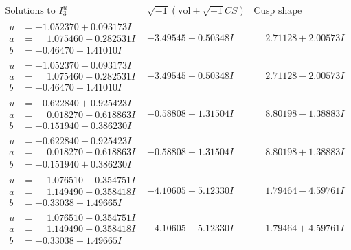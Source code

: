 \documentclass[1p]{elsarticle_modified}
\theoremstyle{definition}
\newcommand{\I}{\sqrt{-1}}
\begin{document}
$$\begin{array}{c|c|c}  
\text{Solutions to }I^u_{3}& \I (\text{vol} + \sqrt{-1}CS) & \text{Cusp shape}\\
 \hline 
\begin{aligned}
u &= -1.052370 + 0.093173 I \\
a &= \phantom{-}1.075460 + 0.282531 I \\
b &= -0.46470 - 1.41010 I\end{aligned}
 & -3.49545 + 0.50348 I & \phantom{-}2.71128 + 2.00573 I \\ \hline\begin{aligned}
u &= -1.052370 - 0.093173 I \\
a &= \phantom{-}1.075460 - 0.282531 I \\
b &= -0.46470 + 1.41010 I\end{aligned}
 & -3.49545 - 0.50348 I & \phantom{-}2.71128 - 2.00573 I \\ \hline\begin{aligned}
u &= -0.622840 + 0.925423 I \\
a &= \phantom{-}0.018270 - 0.618863 I \\
b &= -0.151940 - 0.386230 I\end{aligned}
 & -0.58808 + 1.31504 I & \phantom{-}8.80198 - 1.38883 I \\ \hline\begin{aligned}
u &= -0.622840 - 0.925423 I \\
a &= \phantom{-}0.018270 + 0.618863 I \\
b &= -0.151940 + 0.386230 I\end{aligned}
 & -0.58808 - 1.31504 I & \phantom{-}8.80198 + 1.38883 I \\ \hline\begin{aligned}
u &= \phantom{-}1.076510 + 0.354751 I \\
a &= \phantom{-}1.149490 - 0.358418 I \\
b &= -0.33038 - 1.49665 I\end{aligned}
 & -4.10605 + 5.12330 I & \phantom{-}1.79464 - 4.59761 I \\ \hline\begin{aligned}
u &= \phantom{-}1.076510 - 0.354751 I \\
a &= \phantom{-}1.149490 + 0.358418 I \\
b &= -0.33038 + 1.49665 I\end{aligned}
 & -4.10605 - 5.12330 I & \phantom{-}1.79464 + 4.59761 I \\ \hline\begin{aligned}

\end{aligned}
\end{array}$$
\end{document}
